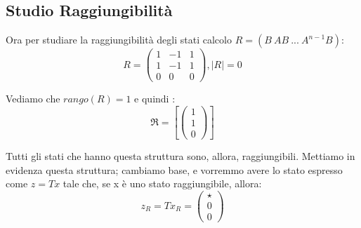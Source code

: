 \documentclass{article}
\begin{document}
\subsection{Studio Raggiungibilità}
Ora per studiare la raggiungibilità degli stati calcolo $R = (B\ AB\ ...\ A^{n-1}B)$: \[ R = \left(\begin{matrix}1 & -1 & 1\\1 & -1 & 1\\0 & 0 & 0\end{matrix}\right), |R| = 0 \] 

Vediamo che $rango(R) = 1$ e quindi : \[ \mathfrak{R} = \left[ \left(\begin{matrix}1\\1\\0\end{matrix}\right)\right] \]

Tutti gli stati che hanno questa struttura sono, allora, raggiungibili. Mettiamo in evidenza questa struttura;
cambiamo base, e vorremmo avere lo stato espresso come $z = Tx$ tale che, se x è uno stato raggiungibile, allora: \[ z_R = T x_R = \begin{pmatrix} \star  \\ 0 \\0\end{pmatrix}\]
\end{document}
